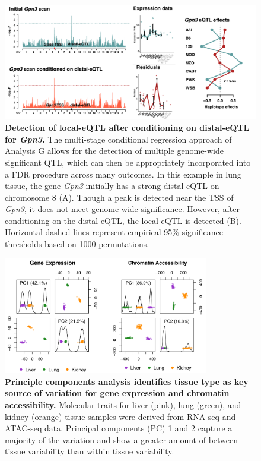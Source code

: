 \documentclass[9pt,twocolumn,twoside]{gsajnl}
\begin{document}
\begin{figure}[hp]
\renewcommand{\familydefault}{\sfdefault}\normalfont
\centering
\includegraphics[width=\textwidth, trim={0in 0in 0in 0in}, clip]{figs/gpn3_conditional_scan.pdf}
\caption{\textbf{Detection of local-eQTL after conditioning on distal-eQTL for \textit{Gpn3}.} 
The multi-stage conditional regression approach of Analysis G allows for the detection of multiple genome-wide significant QTL, which can then be appropriately incorporated into a FDR procedure across many outcomes. In this example in lung tissue, the gene \textit{Gpn3} initially has a strong distal-eQTL on chromosome 8 (A). Though a peak is detected near the TSS of \textit{Gpn3}, it does not meet genome-wide significance. However, after conditioning on the distal-eQTL, the local-eQTL is detected (B). Horizontal dashed lines represent empirical 95\% significance thresholds based on 1000 permutations.
\label{fig:conditional_scans}}
\end{figure}

\begin{figure}[hp]
\renewcommand{\familydefault}{\sfdefault}\normalfont
\centering
\includegraphics[width=0.8\textwidth, trim={0in 0in 0in 0in}, clip]{figs/pca_plot.png}
\caption{\textbf{Principle components analysis identifies tissue type as key source of variation for gene expression and chromatin accessibility.} 
Molecular traits for liver (pink), lung (green), and kidney (orange) tissue samples were derived from RNA-seq and ATAC-seq data. Principal components (PC) 1 and 2 capture a majority of the variation and show a greater amount of between tissue variability than within tissue variability. \label{fig:pca_plots}}
\end{figure}
\end{document}
